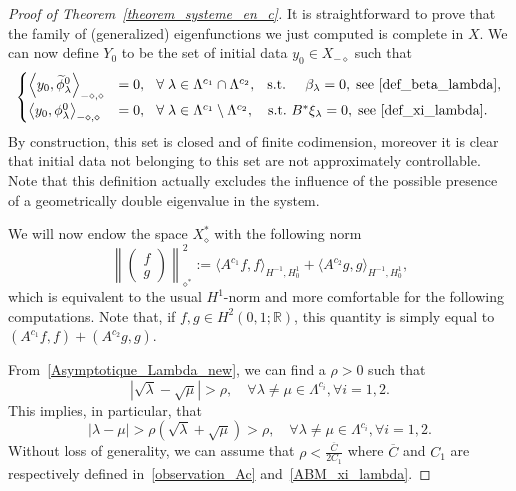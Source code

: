 \documentclass[AHL,Unicode,longabstracts]{cedram}
\newcommand{\Xalphas}{X_\diamond^*}
\newcommand{\Xmalpha}{X_{-\diamond}}
\newcommand{\Fzp}{Y_0}
\newcommand{\normeXalphas}[1]{\left\| #1 \right\|_{\diamond^*}}
\newcommand{\dual}[2]{\left\langle #1, #2 \right\rangle_{-\diamond,\diamond}}
\newcommand{\R}{\mathbb{R}}
\let\oldtilde\tilde
\renewcommand*{\tilde}[1]{\mathchoice{\widetilde{#1}}{\widetilde{#1}}{\oldtilde{#1}}{\oldtilde{#1}}}\let\oldexists\exists
\renewcommand*{\exists}{\mathrel{\oldexists}}
\let\oldforall\forall
\renewcommand*{\forall}{\mathrel{\oldforall}}
\begin{document}
\begin{proof}[Proof of Theorem~\ref{theorem_systeme_en_c}]
It is straightforward to prove that the family of (generalized) eigenfunctions we just computed is complete in $X$. We can now define $\Fzp$ to be the set of initial data $y_0\in \Xmalpha$ such that
\begin{equation}\label{conditions_Y0}
\begin{cases}
\dual{y_0}{\tilde{\phi}^0_\lambda} & = 0, \mkern13mu \forall \lambda\in \Lambda^{c_1}\cap \Lambda^{c_2}, \mkern14mu\text{s.t.} \mkern25mu \beta_\lambda=0, \; \text{see~\eqref{def_beta_lambda}},\\[0.15em] 
\dual{y_0}{\phi_\lambda^0} & = 0, \ \mkern7mu \forall \lambda\in \Lambda^{c_1}\setminus \Lambda^{c_2}, \quad\text{s.t.} \ B^* \xi_\lambda=0, \; \text{see~\eqref{def_xi_lambda}}.
\end{cases}
\end{equation}
By construction, this set is closed and of finite codimension, moreover it is clear that initial data not belonging to this set are not approximately controllable. Note that this definition actually excludes the influence of the possible presence of a geometrically double eigenvalue in the system.



We will now endow the space $\Xalphas$ with the following norm
\[
\normeXalphas{
\begin{pmatrix} f \\ g
\end{pmatrix}}^2 := \langle A^{c_1} f,f\rangle_{H^{-1},H^1_0} + \langle A^{c_2} g,g\rangle_{H^{-1},H^1_0},
\]
which is equivalent to the usual $H^1$-norm and more comfortable for the following computations. Note that, if $f,g\in H^2(0,1 ; \R)$, this quantity is simply equal to $(A^{c_1} f,f) + (A^{c_2}g,g)$.


From~\eqref{Asymptotique_Lambda_new}, we can find a $\rho>0$ such that
\[
\left|\sqrt{\lambda}-\sqrt{\mu}\right| > \rho, \quad\forall \lambda\neq \mu \in \Lambda^{c_i}, \forall i=1,2.
\]
This implies, in particular, that
\begin{equation}\label{gap_potentiel}
|\lambda-\mu| > \rho \left(\sqrt{\lambda}+\sqrt{\mu}\right) > \rho, \quad \forall \lambda\neq \mu \in \Lambda^{c_i}, \forall i=1,2.
\end{equation}
Without loss of generality, we can assume that $\rho < \frac{\overline{C}}{2 C_1}$ where $\overline{C}$ and $C_1$ are respectively defined in~\eqref{observation_Ac} and~\eqref{ABM_xi_lambda}.


\end{proof}
\end{document}
